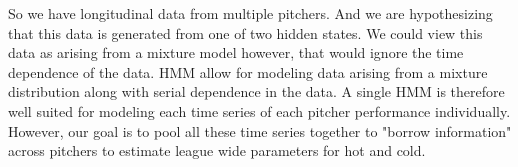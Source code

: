 \documentclass[letterpaper,12pt]{article}\usepackage[]{graphicx}\usepackage[]{color}
\begin{document}
% 
% 
% 
% 
% 
% 
% 
% 
% 
% 
% 
% 
% 
% 
% 
% 
% 
% 
% 
% 

So we have longitudinal data from multiple pitchers.  And we are hypothesizing that this data is generated from one of two hidden states.  We could view this data as arising from a mixture model however, that would ignore the time dependence of the data.  HMM allow for modeling data arising from a mixture distribution along with serial dependence in the data.  A single HMM is therefore well suited for modeling each time series of each pitcher performance individually.  However, our goal is to pool all these time series together to "borrow information" across pitchers to estimate league wide parameters for hot and cold.  
\end{document}
